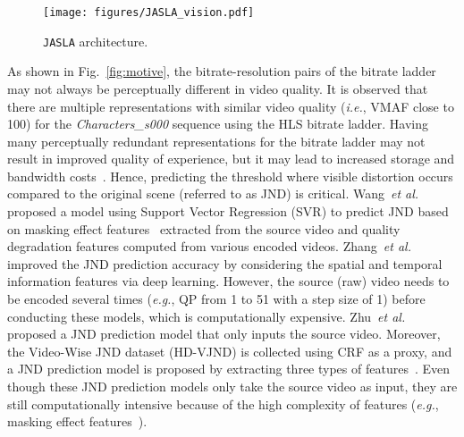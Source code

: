 \documentclass{article}
\newcommand{\etal}{\emph{et al.}\xspace}
\newcommand{\ie}{\emph{i.e.}, }
\newcommand{\eg}{\emph{e.g.}, }
\newcommand{\jaslad}{\texttt{JASLA}\xspace}
\begin{document}
\begin{figure*}[t]
\begin{center}
\texttt{[image: figures/JASLA\_vision.pdf]}
\end{center}
\vspace{-1.75em}
\caption{\jaslad architecture.}
\vspace{-1.25em}
\label{fig:jasla_enc}
\end{figure*}

As shown in Fig.~\ref{fig:motive}, the bitrate-resolution pairs of the bitrate ladder may not always be perceptually different in video quality. It is observed that there are multiple representations with similar video quality (\ie VMAF close to 100) for the \textit{Characters\_s000} sequence using the HLS bitrate ladder. Having many perceptually redundant representations for the bitrate ladder may not result in improved quality of experience, but it may lead to increased storage and bandwidth costs~\cite{rep_num_ref}. Hence, predicting the threshold where visible distortion occurs compared to the original scene (referred to as JND) is critical. Wang~\etal~\cite{jnd_ref1} proposed a model using Support Vector Regression (SVR) to predict JND based on masking effect features~\cite{mask_effect_ref} extracted from the source video and quality degradation features computed from various encoded videos. Zhang~\etal~\cite{jnd_pred2} improved the JND prediction accuracy by considering the spatial and temporal information features via deep learning. However, the source (raw) video needs to be encoded several times (\eg QP from 1 to 51 with a step size of 1) before conducting these models, which is computationally expensive. Zhu~\etal~\cite{jnd_ref2} proposed a JND prediction model that only inputs the source video. Moreover, the Video-Wise JND dataset (HD-VJND) is collected using CRF as a proxy, and a JND prediction model is proposed by extracting three types of features~\cite{zhu2022subjective}. Even though these JND prediction models only take the source video as input, they are still computationally intensive because of the high complexity of features (\eg masking effect features~\cite{mask_effect_ref}).
\end{document}

